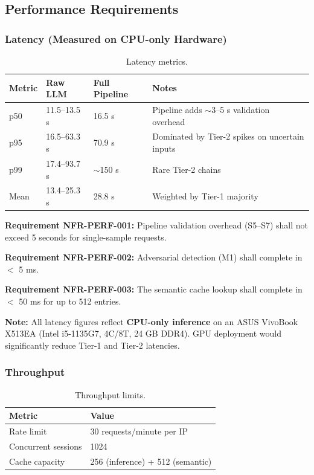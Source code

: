 ﻿\documentclass[10pt,journal,onecolumn]{IEEEtran}
\newcommand{\reqid}[1]{\textbf{#1}}
\begin{document}
\subsection{Performance Requirements}

\subsubsection{Latency (Measured on CPU-only Hardware)}
\begin{table}[t]
\caption{Latency metrics.}
\label{tab:latency}
\begin{tabularx}{\textwidth}{l X X X}
\toprule
\textbf{Metric} & \textbf{Raw LLM} & \textbf{Full Pipeline} & \textbf{Notes}\\
\midrule
p50 & 11.5--13.5 s & 16.5 s & Pipeline adds $\sim$3--5 s validation overhead\\
p95 & 16.5--63.3 s & 70.9 s & Dominated by Tier-2 spikes on uncertain inputs\\
p99 & 17.4--93.7 s & $\sim$150 s & Rare Tier-2 chains\\
Mean & 13.4--25.3 s & 28.8 s & Weighted by Tier-1 majority\\
\bottomrule
\end{tabularx}
\end{table}

\reqid{Requirement NFR-PERF-001:} Pipeline validation overhead (S5--S7) shall not exceed 5 seconds for single-sample requests.

\reqid{Requirement NFR-PERF-002:} Adversarial detection (M1) shall complete in $<$ 5 ms.

\reqid{Requirement NFR-PERF-003:} The semantic cache lookup shall complete in $<$ 50 ms for up to 512 entries.

\textbf{Note:} All latency figures reflect \textbf{CPU-only inference} on an ASUS VivoBook X513EA (Intel i5-1135G7, 4C/8T, 24 GB DDR4). GPU deployment would significantly reduce Tier-1 and Tier-2 latencies.

\subsubsection{Throughput}
\begin{table}[h]
\caption{Throughput limits.}
\label{tab:throughput}
\begin{tabularx}{\columnwidth}{l X}
\toprule
\textbf{Metric} & \textbf{Value}\\
\midrule
Rate limit & 30 requests/minute per IP\\
Concurrent sessions & 1024\\
Cache capacity & 256 (inference) + 512 (semantic)\\
\bottomrule
\end{tabularx}
\end{table}
\end{document}

